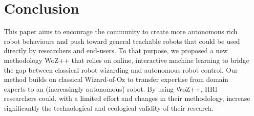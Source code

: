 \documentclass[manuscript, review, anonymous]{acmart}
\newcommand{\ra}[1]{\renewcommand{\arraystretch}{#1}}
\newcommand{\ES}[1]{\added[id=ES]{#1}}
\newcommand{\woz}{WoZ++\xspace}
\begin{document}

\section{Conclusion}


This paper aims to encourage the community to create more autonomous rich robot
behaviours and push toward general teachable robots that could be used directly
by researchers and end-users.  To that purpose, we proposed a new methodology
\woz that relies on online, interactive machine learning to bridge the gap
between classical robot wizarding and autonomous robot control.  Our method
builds on classical Wizard-of-Oz to transfer expertise from domain experts to an
(increasingly autonomous) robot. By using \woz, HRI researchers could, with a
limited effort and changes in their methodology, increase significantly the
technological and ecological validity of their research. 
\end{document}
